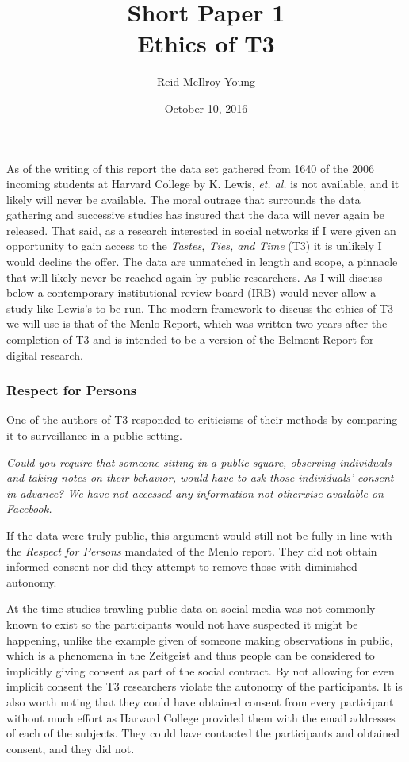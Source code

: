 \documentclass[10pt,a4paper,twocolumn]{article}
\author{Reid McIlroy-Young}
\title{Short Paper 1\\Ethics of T3}
\date{October 10, 2016}
\begin{document}
\setlength{\droptitle}{-60pt}
\maketitle

As of the writing of this report the data set gathered from 1640 of the 2006 incoming students at Harvard College\cite{zimmerblog} by K. Lewis, \textit{et. al.}\cite{t3} is not available\cite{t3site}, and it likely will never be available. The moral outrage\cite{zimethics} that surrounds the data gathering\cite{t3} and successive studies\cite{t3followup1}\cite{t3followup2} has insured that the data will never again be released. That said, as a research interested in social networks if I were given an opportunity to gain access to the \textit{Tastes, Ties, and Time} (T3) it is unlikely I would decline the offer. The data are unmatched in length and scope, a pinnacle that will likely never be reached again by public researchers. As I will discuss below a contemporary institutional review board (IRB) would never allow a study like Lewis's to be run. The modern framework to discuss the ethics of T3 we will use is that of the Menlo Report\cite{menlo}, which was written two years after the completion of T3 and is intended to be a version of the Belmont Report\cite{belmont} for digital research\cite{bitbybit}.

\subsubsection*{Respect for Persons}

One of the authors of T3 responded to criticisms\cite{zimmerblog} of their methods by comparing it to surveillance in a public setting.

\begin{displayquote}
\textit{Could you require that someone sitting in a public square, observing individuals and taking notes on their behavior, would have to ask those individuals’ consent in advance? We have not accessed any information not otherwise available on Facebook.}\cite{zimmerblogcomment}
\end{displayquote}

If the data were truly public, this argument would still not be fully in line with the \textit{Respect for Persons} mandated of the Menlo report. They did not obtain informed consent nor did they attempt to remove those with diminished autonomy. 

At the time studies trawling public data on social media was not commonly known to exist so the participants would not have suspected it might be happening, unlike the example given of someone making observations in public, which is a phenomena in the Zeitgeist and thus people can be considered to implicitly giving consent as part of the social contract. By not allowing for even implicit consent the T3 researchers violate the autonomy of the participants. It is also worth noting that they could have obtained consent from every participant without much effort as Harvard College provided them with the email addresses of each of the subjects\cite{t3}. They could have contacted the participants and obtained consent, and they did not. 
\end{document}
